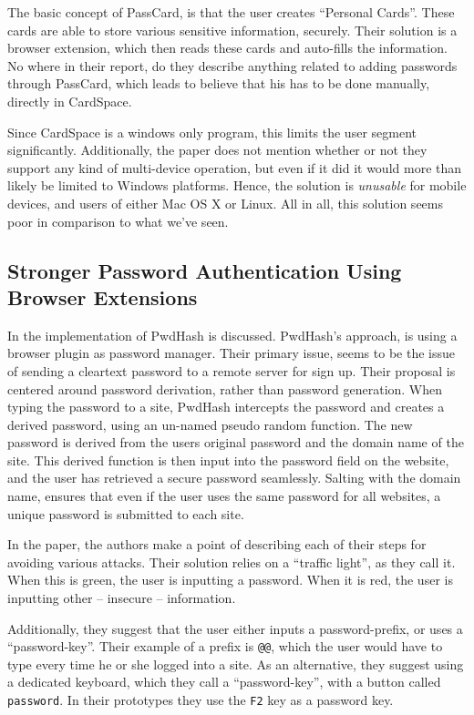 			The basic concept of PassCard, is that the user creates ``Personal Cards''. These cards are able to store various sensitive information, securely. Their solution is a browser extension, which then reads these cards and auto-fills the information. No where in their report, do they describe anything related to adding passwords through PassCard, which leads to believe that his has to be done manually, directly in CardSpace.

			Since CardSpace is a windows only program, this limits the user segment significantly. Additionally, the paper does not mention whether or not they support any kind of multi-device operation, but even if it did it would more than likely be limited to Windows platforms. Hence, the solution is \emph{unusable} for mobile devices, and users of either Mac OS X or Linux. All in all, this solution seems poor in comparison to what we've seen.

		\subsection*{Stronger Password Authentication Using Browser Extensions}
			In \cite{pwdhash} the implementation of PwdHash is discussed. PwdHash's approach, is using a browser plugin as password manager. Their primary issue, seems to be the issue of sending a cleartext password to a remote server for sign up. Their proposal is centered around password derivation, rather than password generation. When typing the password to a site, PwdHash intercepts the password and creates a derived password, using an un-named pseudo random function. The new password is derived from the users original password and the domain name of the site. This derived function is then input into the password field on the website, and the user has retrieved a secure password seamlessly. Salting with the domain name, ensures that even if the user uses the same password for all websites, a unique password is submitted to each site.

			In the paper, the authors make a point of describing each of their steps for avoiding various attacks. Their solution relies on a ``traffic light'', as they call it. When this is green, the user is inputting a password. When it is red, the user is inputting other -- insecure -- information. 

			Additionally, they suggest that the user either inputs a password-prefix, or uses a ``password-key''. Their example of a prefix is \verb=@@=, which the user would have to type every time he or she logged into a site. As an alternative, they suggest using a dedicated keyboard, which they call a ``password-key'', with a button called \verb=password=. In their prototypes they use the \verb=F2= key as a password key.

